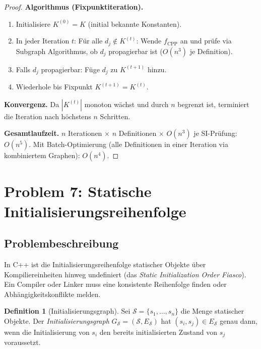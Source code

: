 ﻿\documentclass[a4paper,12pt]{article}
\theoremstyle{definition}
\newtheorem{definition}{Definition}
\begin{document}
\begin{proof}
\textbf{Algorithmus (Fixpunktiteration).}
\begin{enumerate}
    \item Initialisiere $K^{(0)} = K$ (initial bekannte Konstanten).
    \item In jeder Iteration $t$: Für alle $d_j \notin K^{(t)}$: Wende $f_{\text{CPP}}$ an und prüfe via Subgraph Algorithmus, ob $d_j$ propagierbar ist ($O(n^3)$ je Definition).
    \item Falls $d_j$ propagierbar: Füge $d_j$ zu $K^{(t+1)}$ hinzu.
    \item Wiederhole bis Fixpunkt $K^{(t+1)} = K^{(t)}$.
\end{enumerate}

\textbf{Konvergenz.} Da $|K^{(t)}|$ monoton wächst und durch $n$ begrenzt ist, terminiert die Iteration nach höchstens $n$ Schritten.

\textbf{Gesamtlaufzeit.} $n$ Iterationen $\times$ $n$ Definitionen $\times$ $O(n^3)$ je SI-Prüfung: $O(n^5)$. Mit Batch-Optimierung (alle Definitionen in einer Iteration via kombiniertem Graphen): $O(n^4)$.
\end{proof}

\section{Problem 7: Statische Initialisierungsreihenfolge}
\label{sec:init}

\subsection{Problembeschreibung}

In C++ ist die Initialisierungsreihenfolge statischer Objekte über Kompiliereinheiten hinweg undefiniert (das \emph{Static Initialization Order Fiasco}). Ein Compiler oder Linker muss eine konsistente Reihenfolge finden oder Abhängigkeitskonflikte melden.

\begin{definition}[Initialisierungsgraph]
\label{def:ig2}
Sei $\mathcal{S} = \{s_1, \ldots, s_n\}$ die Menge statischer Objekte. Der \emph{Initialisierungsgraph} $G_{\mathcal{S}} = (\mathcal{S}, E_{\mathcal{S}})$ hat $(s_i, s_j) \in E_{\mathcal{S}}$ genau dann, wenn die Initialisierung von $s_i$ den bereits initialisierten Zustand von $s_j$ voraussetzt.
\end{definition}
\end{document}
